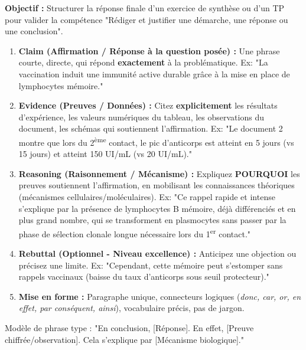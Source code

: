 \documentclass[11pt]{article}
\newcommand{\cle}[1]{{\popxbold\color{popdark}#1}}
\begin{document}
\begin{methode}
\textbf{Objectif :} Structurer la réponse finale d'un exercice de synthèse ou d'un TP pour valider la compétence "Rédiger et justifier une démarche, une réponse ou une conclusion".
\begin{enumerate}
 \item \textbf{Claim (Affirmation / Réponse à la question posée) :} Une phrase courte, directe, qui répond \textbf{exactement} à la problématique. Ex: "La vaccination induit une immunité active durable grâce à la mise en place de lymphocytes mémoire."
 \item \textbf{Evidence (Preuves / Données) :} Citez \textbf{explicitement} les résultats d'expérience, les valeurs numériques du tableau, les observations du document, les schémas qui soutiennent l'affirmation. Ex: "Le document 2 montre que lors du 2\textsuperscript{ème} contact, le pic d'anticorps est atteint en 5 jours (vs 15 jours) et atteint 150 UI/mL (vs 20 UI/mL)."
 \item \textbf{Reasoning (Raisonnement / Mécanisme) :} Expliquez \textbf{POURQUOI} les preuves soutiennent l'affirmation, en mobilisant les connaissances théoriques (mécanismes cellulaires/moléculaires). Ex: "Ce rappel rapide et intense s'explique par la présence de lymphocytes B mémoire, déjà différenciés et en plus grand nombre, qui se transforment en plasmocytes sans passer par la phase de sélection clonale longue nécessaire lors du 1\textsuperscript{er} contact."
 \item \textbf{Rebuttal (Optionnel - Niveau excellence) :} Anticipez une objection ou précisez une limite. Ex: "Cependant, cette mémoire peut s'estomper sans rappels vaccinaux (baisse du taux d'anticorps sous seuil protecteur)."
 \item \textbf{Mise en forme :} Paragraphe unique, connecteurs logiques (\textit{donc, car, or, en effet, par conséquent, ainsi}), vocabulaire précis, pas de jargon.
\end{enumerate}
\cle{Modèle de phrase type :} "En conclusion, [Réponse]. En effet, [Preuve chiffrée/observation]. Cela s'explique par [Mécanisme biologique]."
\end{methode}
\end{document}
